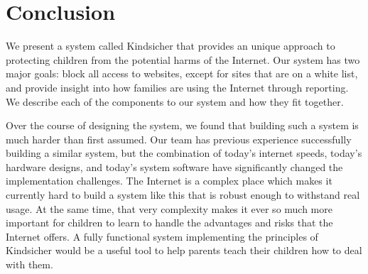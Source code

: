 
\section{Conclusion}

We present a system called Kindsicher that provides an unique approach to
protecting children from the potential harms of the Internet. Our system has
two major goals: block all access to websites, except for sites that are on a
white list, and provide insight into how families are using the Internet through
reporting. We describe each of the components to our system and how they fit
together.

Over the course of designing the system, we found that building such a system
is much harder than first assumed.  
%
Our team has previous experience successfully building a similar system, but
the combination of today's internet speeds, today's hardware designs,
and today's system software have significantly changed the implementation
challenges.
%
The Internet is a complex place which makes it currently hard to build a
system like this that is robust enough to withstand real usage.
%
At the same time, that very complexity makes it ever so much more
important for children to learn to handle the advantages and risks that
the Internet offers.  A fully functional system implementing the principles of
Kindsicher would be a useful tool to help parents teach their children how to
deal with them.

